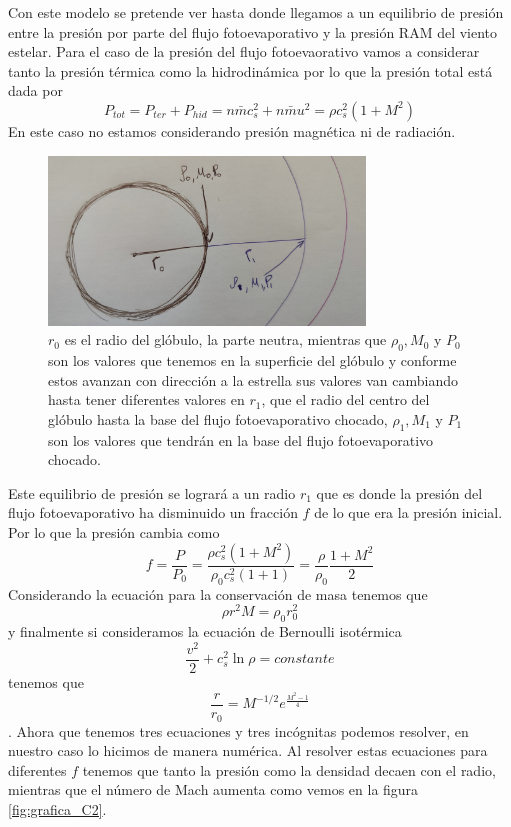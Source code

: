 \documentclass{book}
\begin{document}
Con este modelo se pretende ver hasta donde llegamos a un equilibrio de presión entre la presión por parte del flujo fotoevaporativo y la presión RAM del viento estelar. Para el caso de la presión del flujo fotoevaorativo vamos a considerar tanto la presión térmica como la hidrodinámica por lo que la presión total está dada por
\[P_{tot}=P_{ter}+P_{hid}=n\bar{m}c_s^2+n\bar{m}u^2=\rho c_s^2(1+M^2)\]
En este caso no estamos considerando presión magnética ni de radiación.

\begin{figure}[h]
    \centering \includegraphics[width=0.75\textwidth]{images Chapter 2/C2_parameters.jpg}
    \caption{$r_0$ es el radio del glóbulo, la parte neutra, mientras que $\rho_0,M_0$ y $P_0$ son los valores que tenemos en la superficie del glóbulo y conforme estos avanzan con dirección a la estrella sus valores van cambiando hasta tener diferentes valores en $r_1$, que el radio del centro del glóbulo hasta la base del flujo fotoevaporativo chocado, $\rho_1,M_1$ y $P_1$ son los valores que tendrán en la base del flujo fotoevaporativo chocado.}
    \label{fig:parameters}
\end{figure}

Este equilibrio de presión se logrará a un radio $r_1$ que es donde la presión del flujo fotoevaporativo ha disminuido un fracción $f$ de lo que era la presión inicial. Por lo que la presión cambia como 
\[f=\frac{P}{P_0}=\frac{\rho c_s^2(1+M^2)}{\rho_0 c_s^2(1+1)}=\frac{\rho}{\rho_0}\frac{1+M^2}{2}\]
Considerando la ecuación para la conservación de masa tenemos que
\[\rho r^2M	=\rho_0 r_0^2\]
y finalmente si consideramos la ecuación de Bernoulli isotérmica 
\[\frac{v^2}{2}+c_s^2\ln\rho=constante\]
tenemos que 
\[\frac{r}{r_0}=M^{-1/2}e^{\frac{M^2-1}{4}}\] \cite{Dyson:1968}.
Ahora que tenemos tres ecuaciones y tres incógnitas podemos resolver, en nuestro caso lo hicimos de manera numérica. Al resolver estas ecuaciones para diferentes $f$ tenemos que tanto la presión como la densidad decaen con el radio, mientras que el número de Mach aumenta como vemos en la figura \ref{fig:grafica_C2}.
\end{document}
